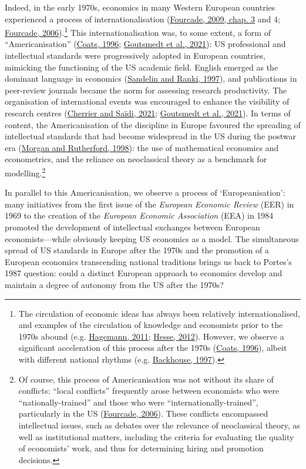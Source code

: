 \documentclass[
  12pt,
  onecolumn]{article}
\begin{document}
Indeed, in the early 1970s, economics in many Western European countries experienced a process of internationalisation (\protect\hyperlink{ref-fourcade2009}{Fourcade, 2009, chap. 3} and 4; \protect\hyperlink{ref-fourcade2006}{Fourcade, 2006}).\footnote{The circulation of economic ideas has always been relatively internationalised, and examples of the circulation of knowledge and economists prior to the 1970s abound (e.g. \protect\hyperlink{ref-hagemann2011a}{Hagemann, 2011}; \protect\hyperlink{ref-hesse2012}{Hesse, 2012}). However, we observe a significant acceleration of this process after the 1970s (\protect\hyperlink{ref-coats1996}{Coats, 1996}), albeit with different national rhythms (e.g. \protect\hyperlink{ref-backhouse1997a}{Backhouse, 1997}).} This internationalisation was, to some extent, a form of ``Americanisation'' (\protect\hyperlink{ref-coats1996}{Coats, 1996}; \protect\hyperlink{ref-goutsmedt2021}{Goutsmedt et al., 2021}): US professional and intellectual standards were progressively adopted in European countries, mimicking the functioning of the US academic field. English emerged as the dominant language in economics (\protect\hyperlink{ref-sandelin1997}{Sandelin and Ranki, 1997}), and publications in peer-review journals became the norm for assessing research productivity. The organisation of international events was encouraged to enhance the visibility of research centres (\protect\hyperlink{ref-cherrier2021}{Cherrier and Saïdi, 2021}; \protect\hyperlink{ref-goutsmedt2021}{Goutsmedt et al., 2021}). In terms of content, the Americanisation of the discipline in Europe favoured the spreading of intellectual standards that had become widespread in the US during the postwar era (\protect\hyperlink{ref-morgan1998}{Morgan and Rutherford, 1998}): the use of mathematical economics and econometrics, and the reliance on neoclassical theory as a benchmark for modelling.\footnote{Of course, this process of Americanisation was not without its share of conflicts: ``local conflicts'' frequently arose between economists who were ``nationally-trained'' and those who were ``internationally-trained'', particularly in the US (\protect\hyperlink{ref-fourcade2006}{Fourcade, 2006}). These conflicts encompassed intellectual issues, such as debates over the relevance of neoclassical theory, as well as institutional matters, including the criteria for evaluating the quality of economists' work, and thus for determining hiring and promotion decisions.}

In parallel to this Americanisation, we observe a process of `Europeanisation': many initiatives from the first issue of the \emph{European Economic Review} (EER) in 1969 to the creation of the \emph{European Economic Association} (EEA) in 1984 promoted the development of intellectual exchanges between European economists---while obviously keeping US economics as a model. The simultaneous spread of US standards in Europe after the 1970s and the promotion of a European economics transcending national traditions brings us back to Portes's 1987 question: could a distinct European approach to economics develop and maintain a degree of autonomy from the US after the 1970s?
\end{document}
